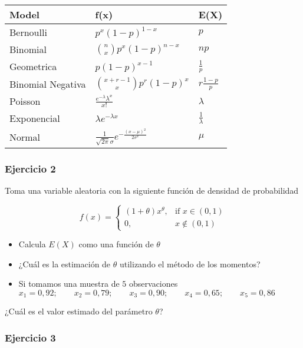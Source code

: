 \documentclass[
]{book}
\providecommand{\tightlist}{%
  \setlength{\itemsep}{0pt}\setlength{\parskip}{0pt}}
\begin{document}
\begin{longtable}[]{@{}lll@{}}
\toprule
Model & f(x) & E(X) \\
\midrule
\endhead
Bernoulli & \(p^x(1-p)^{1-x}\) & \(p\) \\
Binomial & \(\binom n x p^x(1-p)^{n-x}\) & \(np\) \\
Geometrica & \(p(1-p)^{x-1}\) & \(\frac{1}{p}\) \\
Binomial Negativa & \(\binom {x+r-1} x p^r(1-p)^x\) & \(r\frac{1-p}{p}\) \\
Poisson & \(\frac{e^{-\lambda}\lambda^x}{x!}\) & \(\lambda\) \\
Exponencial & \(\lambda e^{-\lambda x}\) & \(\frac{1}{\lambda}\) \\
Normal & \(\frac{1}{\sqrt{2\pi}\sigma}e^{-\frac{(x-\mu)^2}{2\sigma^2}}\) & \(\mu\) \\
\bottomrule
\end{longtable}

\hypertarget{ejercicio-2-10}{%
\subsubsection{Ejercicio 2}\label{ejercicio-2-10}}

Toma una variable aleatoria con la siguiente función de densidad de probabilidad

\[
f(x)=
\begin{cases}
    (1+\theta)x^\theta,& \text{if } x\in (0,1)\\
    0,& x\notin (0,1)
\end{cases}
\]

\begin{itemize}
\tightlist
\item
  Calcula \(E(X)\) como una función de \(\theta\)
\item
  ¿Cuál es la estimación de \(\theta\) utilizando el método de los momentos?
\item
  Si tomamos una muestra de \(5\) observaciones
  \(x_1 = 0,92; \qquad x_2 = 0,79; \qquad x_3 = 0,90; \qquad x_4 = 0,65; \qquad x_5 = 0,86\)
\end{itemize}

¿Cuál es el valor estimado del parámetro \(\theta\)?

\hypertarget{ejercicio-3-7}{%
\subsubsection{Ejercicio 3}\label{ejercicio-3-7}}
\end{document}
